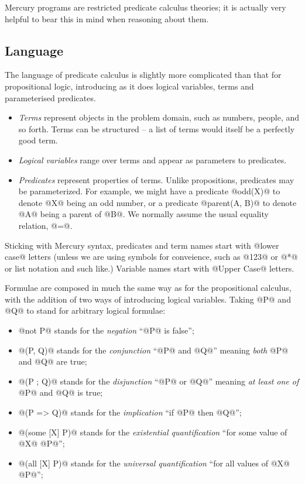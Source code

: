 Mercury programs are restricted predicate calculus theories; it is
actually very helpful to bear this in mind when reasoning about them.

\subsection{Language}

The language of predicate calculus is slightly more complicated than
that for propositional logic, introducing as it does logical variables,
terms and parameterised predicates.
\begin{itemize}
\item \emph{Terms} represent objects in the problem domain, such as
numbers, people, and so forth.  Terms can be structured -- a list of
terms would itself be a perfectly good term.
\item \emph{Logical variables} range over terms and appear as parameters
to predicates.
\item \emph{Predicates} represent properties of terms.  Unlike
propositions, predicates may be parameterized.  For example, we might
have a predicate @odd(X)@ to denote @X@ being an odd number, or a
predicate @parent(A, B)@ to denote @A@ being a parent of @B@.  We
normally assume the usual equality relation, @=@.
\end{itemize}
Sticking with Mercury syntax, predicates and term names start with
@lower case@ letters (unless we are using symbols for conveience, such
as @123@ or @*@ or list notation and such like.)  Variable names start
with @Upper Case@ letters.

Formulae are composed in much the same way as for the propositional
calculus, with the addition of two ways of introducing logical
variables.  Taking @P@ and @Q@ to stand for arbitrary logical formulae:
\begin{itemize}
\item @not P@ stands for the \emph{negation} ``@P@ is false'';
\item @(P, Q)@ stands for the \emph{conjunction} ``@P@ and @Q@'' meaning
\emph{both} @P@ and @Q@ are true;
\item @(P ; Q)@ stands for the \emph{disjunction} ``@P@ or @Q@'' meaning
\emph{at least one of} @P@ and @Q@ is true;
\item @(P => Q)@ stands for the \emph{implication} ``if @P@ then @Q@'';
\item @(some [X] P)@ stands for the \emph{existential
quantification} ``for some value of @X@ @P@'';
\item @(all [X] P)@ stands for the \emph{universal
quantification} ``for all values of @X@ @P@'';
\end{itemize}

